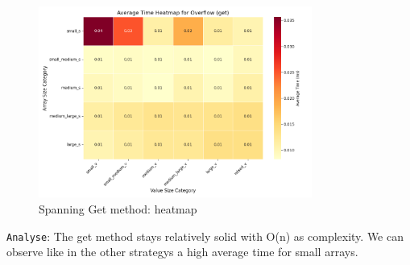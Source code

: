 \documentclass[11pt, a4paper]{article}
\begin{document}
	\begin{figure}[H]%
		\centering
		\includegraphics[width=0.8\textwidth]{Grafics/Overflow/OverflowGetHeat.png}
		\caption{Spanning Get method: heatmap}
		\label{fig:30}
	\end{figure}
	\texttt{Analyse}: The get method stays relatively solid with O(n) as complexity. We can observe like in the other strategys a high average time for small arrays.
	
	
\end{document}

